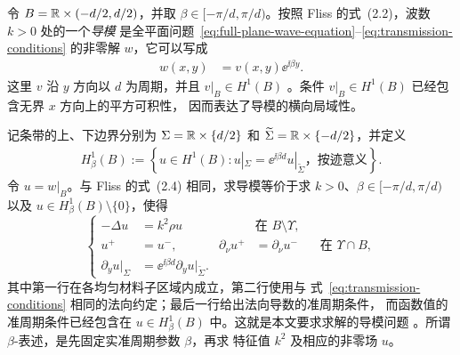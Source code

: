 令
$B=\mathbb{R}\times(-d/2,d/2)$，并取
$\beta\in[-\pi/d,\pi/d)$。按照 Fliss 的式~(2.2)，波数 $k>0$ 处的一个\emph{导模}
是全平面问题~\eqref{eq:full-plane-wave-equation}--\eqref{eq:transmission-conditions} 的非零解
$w$，它可以写成
\begin{align}
  w(x,y)&=v(x,y)\ee^{\ii\beta y}.
  \label{eq:guided-mode-definition}
\end{align}
这里 $v$ 沿 $y$ 方向以 $d$ 为周期，并且 $v|_B\in H^1(B)$
\cite[(2.2)]{Fliss2013}。条件 $v|_B\in H^1(B)$ 已经包含无界 $x$ 方向上的平方可积性，
因而表达了导模的横向局域性。

记条带的上、下边界分别为
$\Sigma=\mathbb{R}\times\{d/2\}$ 和 $\widetilde\Sigma=\mathbb{R}\times\{-d/2\}$，并定义
\begin{align}
  H^1_\beta(B)
  :=\left\{u\in H^1(B):
  u|_\Sigma=\ee^{\ii\beta d}u|_{\widetilde\Sigma}
  \text{，按迹意义}\right\}.
  \label{eq:quasiperiodic-space}
\end{align}
令 $u=w|_B$。与 Fliss 的式~(2.4) 相同，求导模等价于求
$k>0$、$\beta\in[-\pi/d,\pi/d)$ 以及
$u\in H^1_\beta(B)\setminus\{0\}$，使得
\begin{equation}
  \left\{
  \begin{aligned}
    -\Delta u&=k^2\rho u
    &&\text{在 }B\setminus\Upsilon,\\
    u^+&=u^-,
    &\partial_\nu u^+&=\partial_\nu u^-
    &&\text{在 }\Upsilon\cap B,\\
    \partial_yu|_\Sigma
    &=\ee^{\ii\beta d}\partial_yu|_{\widetilde\Sigma}.
  \end{aligned}
  \right.
  \label{eq:guided-mode-strip-problem}
\end{equation}
其中第一行在各均匀材料子区域内成立，第二行使用与
式~\eqref{eq:transmission-conditions} 相同的法向约定；最后一行给出法向导数的准周期条件，
而函数值的准周期条件已经包含在
$u\in H^1_\beta(B)$ 中。这就是本文要求求解的导模问题
\cite[(2.4)]{Fliss2013}。所谓 $\beta$-表述，是先固定实准周期参数 $\beta$，再求
特征值 $k^2$ 及相应的非零场 $u$。

